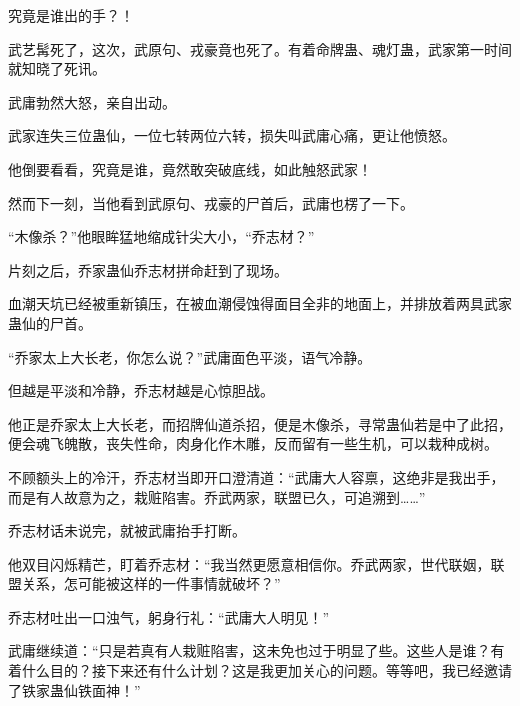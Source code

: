 \begin{this_body}
究竟是谁出的手？！

武艺髯死了，这次，武原句、戎豪竟也死了。有着命牌蛊、魂灯蛊，武家第一时间就知晓了死讯。

武庸勃然大怒，亲自出动。

武家连失三位蛊仙，一位七转两位六转，损失叫武庸心痛，更让他愤怒。

他倒要看看，究竟是谁，竟然敢突破底线，如此触怒武家！

然而下一刻，当他看到武原句、戎豪的尸首后，武庸也楞了一下。

“木像杀？”他眼眸猛地缩成针尖大小，“乔志材？”

片刻之后，乔家蛊仙乔志材拼命赶到了现场。

血潮天坑已经被重新镇压，在被血潮侵蚀得面目全非的地面上，并排放着两具武家蛊仙的尸首。

“乔家太上大长老，你怎么说？”武庸面色平淡，语气冷静。

但越是平淡和冷静，乔志材越是心惊胆战。

他正是乔家太上大长老，而招牌仙道杀招，便是木像杀，寻常蛊仙若是中了此招，便会魂飞魄散，丧失性命，肉身化作木雕，反而留有一些生机，可以栽种成树。

不顾额头上的冷汗，乔志材当即开口澄清道：“武庸大人容禀，这绝非是我出手，而是有人故意为之，栽赃陷害。乔武两家，联盟已久，可追溯到……”

乔志材话未说完，就被武庸抬手打断。

他双目闪烁精芒，盯着乔志材：“我当然更愿意相信你。乔武两家，世代联姻，联盟关系，怎可能被这样的一件事情就破坏？”

乔志材吐出一口浊气，躬身行礼：“武庸大人明见！”

武庸继续道：“只是若真有人栽赃陷害，这未免也过于明显了些。这些人是谁？有着什么目的？接下来还有什么计划？这是我更加关心的问题。等等吧，我已经邀请了铁家蛊仙铁面神！”

\end{this_body}

